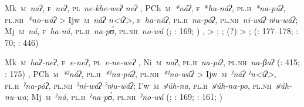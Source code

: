 \begin{adjustwidth}{6mm}{0pt}

Mk~\textsc{m}~\textit{naʔ}, \textsc{f}~\textit{neʔ}, \textsc{pl}~\textit{ne\mbox{-}khe\mbox{-}weʔ \recind neʔ} \citep[166]{AG99} {\sep} PCh~\textsc{m}~\textit{*náʔ}, \textsc{f}~\textsc{*}\textit{ha\mbox{-}náʔ}, \textsc{pl.h}~\textit{*na\mbox{-}púʔ}, \textsc{pl.nh}~\textit{*no\mbox{-}wáʔ} > Ijw~\textsc{m}~\textit{náʔ \recind n<íʔ>}, \textsc{f}~\textit{ha\mbox{-}náʔ}, \textsc{pl.h}~\textit{na\mbox{-}póʔ}, \textsc{pl.nh}~\textit{ni\mbox{-}wáʔ \recind nʲu\mbox{-}wáʔ}; Mj~\textsc{m}~\textit{ná}, \textsc{f}~\textit{ha\mbox{-}ná}, \textsc{pl.h}~\textit{na\mbox{-}pʊ́}, \textsc{pl.nh}~\textit{no\mbox{-}wá} (\citealt{JC14a}; \citealt{ND09}: 169; \citealt{JC18}) {\sep}  > ; ; (?)  > ;  (\citealt{VN14}: 177–178; \citealt{MG-MELO15}: 70; \citealt{JAA-KC-14}: 446)




Mk~\textsc{m}~\textit{haʔ\mbox{-}neʔ}, \textsc{f}~\textit{e\mbox{-}neʔ}, \textsc{pl}~\textit{e\mbox{-}ne\mbox{-}weʔ} \citep[166]{AG94} {\sep} Ni~\textsc{m}~\textit{naʔ}, \textsc{pl.h}~\textit{na\mbox{-}piʔ}, \textsc{pl.nh}~\textit{na\mbox{-}βaʔ} (\citealt{AnG15-evid}: 415; \citealt{LC20}: 175) {\sep} PCh~\textsc{m}~\textit{*ˀnáʔ}, \textsc{pl.h}~\textit{*ˀna\mbox{-}púʔ}, \textsc{pl.nh}~\textit{*ˀno\mbox{-}wáʔ} > Ijw~\textsc{m~}\textit{ˀnáʔ \recind ˀn<íʔ>}, \textsc{pl.h}~\textit{ˀna\mbox{-}póʔ}, \textsc{pl.nh}~\textit{ˀni\mbox{-}wáʔ \recind ˀnʲu\mbox{-}wáʔ}; I’w~\textsc{m}~\textit{sʲúh\mbox{-}na}, \textsc{pl.h}~\textit{sʲúh\mbox{-}na\mbox{-}po}, \textsc{pl.nh}~\textit{sʲúh\mbox{-}nu\mbox{-}wa}; Mj~\textsc{m}~\textit{ˀná}, \textsc{pl.h}~\textit{ˀna\mbox{-}pʊ́}, \textsc{pl.nh}~\textit{ˀno\mbox{-}wá} (\citealt{JC14a}; \citealt{ND09}: 169; \citealt{AG83}: 161; \citealt{JC18})



\end{adjustwidth}
